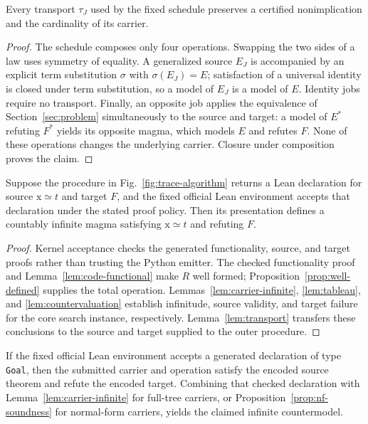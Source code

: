 \documentclass[runningheads]{llncs}
\begin{document}
\begin{lemma}
\label{lem:transport}
Every transport $\tau_J$ used by the fixed schedule preserves a certified
nonimplication and the cardinality of its carrier.
\end{lemma}

\begin{proof}
The schedule composes only four operations.  Swapping the two sides of a law
uses symmetry of equality.  A generalized source $E_J$ is accompanied by an
explicit term substitution $\sigma$ with $\sigma(E_J)=E$; satisfaction of a
universal identity is closed under term substitution, so a model of $E_J$ is
a model of $E$.  Identity jobs require no transport.  Finally, an opposite
job applies the equivalence of Section~\ref{sec:problem} simultaneously to
the source and target: a model of $E^*$ refuting $F^*$ yields its opposite
magma, which models $E$ and refutes $F$.  None of these operations changes
the underlying carrier.  Closure under composition proves the claim.
\end{proof}

\begin{theorem}
\label{thm:candidate}
Suppose the procedure in Fig.~\ref{fig:trace-algorithm} returns a Lean
declaration for source $\mathrm{x}\simeq t$ and target $F$, and the fixed
official Lean environment accepts that declaration under the stated proof
policy.  Then its
presentation defines a countably infinite magma satisfying
$\mathrm{x}\simeq t$ and refuting $F$.
\end{theorem}

\begin{proof}
Kernel acceptance checks the generated functionality, source, and target
proofs rather than trusting the Python emitter.  The checked functionality
proof and Lemma~\ref{lem:code-functional} make $R$ well formed;
Proposition~\ref{prop:well-defined} supplies the total operation.
Lemmas~\ref{lem:carrier-infinite}, \ref{lem:tableau}, and
\ref{lem:countervaluation} establish infinitude, source validity, and target
failure for the core search instance, respectively.  Lemma~\ref{lem:transport}
transfers these conclusions to the source and target supplied to the outer
procedure.
\end{proof}

\begin{corollary}
\label{cor:kernel-result}
If the fixed official Lean environment accepts a generated declaration of
type \texttt{Goal}, then the submitted carrier and operation satisfy the
encoded source theorem and refute the encoded target.  Combining that checked
declaration with Lemma~\ref{lem:carrier-infinite} for full-tree carriers, or
Proposition~\ref{prop:nf-soundness} for normal-form carriers, yields the
claimed infinite countermodel.
\end{corollary}
\end{document}
